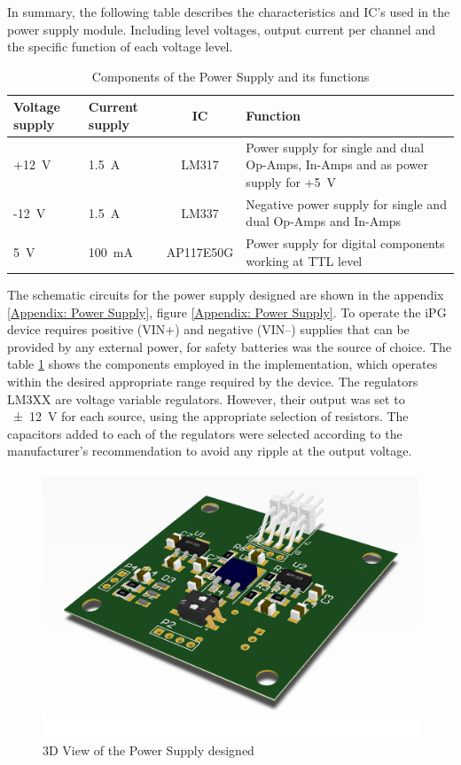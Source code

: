 In summary, the following table describes the characteristics and IC's used in the power supply module. Including level voltages, output current per channel and the specific function of each voltage level. 

\begin{table}[!htpb]
	\caption{Components of the Power Supply and its functions}
	\centering
	\label{table:power supply details}
	\begin{tabular}{p{2 cm} p{2 cm} c p{6 cm}}
		\toprule
		\textbf{Voltage supply} & \textbf{Current supply} & \textbf{IC} & \textbf{Function} \\ 
		\midrule
		+\SI{12}{\volt} & \SI{1.5}{\ampere} & LM317 & Power supply for single and dual Op-Amps, In-Amps and as power supply for +\SI{5}{\volt} \\ 
		\midrule 
		-\SI{12}{\volt} & \SI{1.5}{\ampere} & LM337 & Negative power supply for single and dual Op-Amps and In-Amps \\ 
		\midrule 
		\SI{5}{\volt} & \SI{100}{\milli\ampere} & AP117E50G & Power supply for digital components working at TTL level \\ 
		\bottomrule 
	\end{tabular}
\end{table}

The schematic circuits for the power supply designed are shown in the appendix \ref{Appendix: Power Supply}, figure \ref{Appendix: Power Supply}. To operate the iPG device requires positive (VIN+) and negative (VIN–) supplies that can be provided by any external power, for safety batteries was the source of choice. The table \ref{table:power supply details} shows the components employed in the implementation, which operates within the desired appropriate range required by the device. The regulators LM3XX are voltage variable regulators. However, their output was set to \SI{\pm 12}{\volt} for each source, using the appropriate selection of resistors. The capacitors added to each of the regulators were selected according to the manufacturer’s recommendation to avoid any ripple at the output voltage.

\begin{figure}[!htpb]
	\centering
	\includegraphics[width=7.5 cm,keepaspectratio]{figure_PS}
	\caption{3D View of the Power Supply designed}
	\label{fig:3D PS}
\end{figure}

